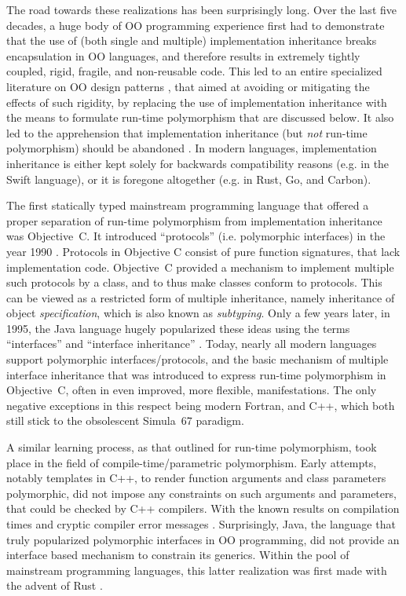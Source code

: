 \documentclass[11pt,oneside]{report}
\begin{document}
The road towards these realizations has been surprisingly long. Over
the last five decades, a huge body of OO programming experience first
had to demonstrate that the use of (both single and multiple)
implementation inheritance breaks encapsulation in OO languages, and
therefore results in extremely tightly coupled, rigid, fragile, and
non-reusable code. This led to an entire specialized literature on OO
design patterns \cite{Gamma_et_al_94,Martin_03,Holub_04}, that aimed
at avoiding or mitigating the effects of such rigidity, by replacing
the use of implementation inheritance with the means to formulate
run-time polymorphism that are discussed below. It also led to the
apprehension that implementation inheritance (but \emph{not} run-time
polymorphism) should be abandoned \cite{Weck_Szyperski}. In modern
languages, implementation inheritance is either kept solely for
backwards compatibility reasons (e.g. in the Swift language), or it is
foregone altogether (e.g. in Rust, Go, and Carbon).

The first statically typed mainstream programming language that
offered a proper separation of run-time polymorphism from
implementation inheritance was Objective~C. It introduced
``protocols'' (i.e. polymorphic interfaces) in the year 1990
\cite{Cox_et_al_20}. Protocols in Objective C consist of pure function
signatures, that lack implementation code. Objective~C provided a
mechanism to implement multiple such protocols by a class, and to thus
make classes conform to protocols. This can be viewed as a restricted
form of multiple inheritance, namely inheritance of object
\emph{specification}, which is also known as \emph{subtyping}. Only a
few years later, in 1995, the Java language hugely popularized these
ideas using the terms ``interfaces'' and ``interface inheritance''
\cite{Cox_et_al_20}. Today, nearly all modern languages support
polymorphic interfaces/protocols, and the basic mechanism of multiple
interface inheritance that was introduced to express run-time
polymorphism in Objective~C, often in even improved, more flexible,
manifestations. The only negative exceptions in this respect being
modern Fortran, and C++, which both still stick to the obsolescent
Simula~67 paradigm.

A similar learning process, as that outlined for run-time
polymorphism, took place in the field of compile-time/parametric
polymorphism. Early attempts, notably templates in C++, to render
function arguments and class parameters polymorphic, did not impose
any constraints on such arguments and parameters, that could be
checked by C++ compilers. With the known results on compilation times
and cryptic compiler error messages
\cite{Haveraaen_et_al_19}. Surprisingly, Java, the language that truly
popularized polymorphic interfaces in OO programming, did not provide
an interface based mechanism to constrain its generics. Within the
pool of mainstream programming languages, this latter realization was
first made with the advent of Rust \cite{Matsakis_2014}.
\end{document}
